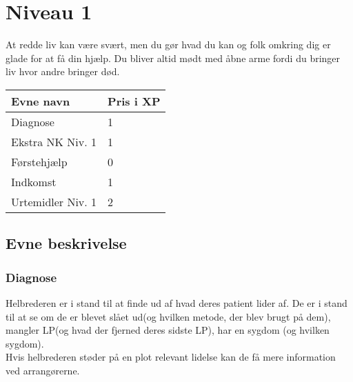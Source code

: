 \chapter{Niveau 1}
At redde liv kan være svært, men du gør hvad du kan og folk omkring dig er glade for at få din hjælp. Du bliver altid mødt med åbne arme fordi du bringer liv hvor andre bringer død.
\begin{table}[H]
    \centering
    \begin{tabular}{|p{}|p{}|}
    \rowcolor{cerulean!80}\hline
        Evne navn & Pris i XP \\\hline
        Diagnose & 1\\\hline
        Ekstra NK Niv. 1 & 1\\\hline
        Førstehjælp & 0\\\hline
        Indkomst &1 \\\hline
        Urtemidler Niv. 1 & 2\\\hline
    \end{tabular}
\end{table}

\section{Evne beskrivelse}

\subsection{Diagnose}
Helbrederen er i stand til at finde ud af hvad deres patient lider af. De er i stand til at se om de er blevet slået ud(og hvilken metode, der blev brugt på dem), mangler LP(og hvad der fjerned deres sidste LP), har en sygdom (og hvilken sygdom).\\
Hvis helbrederen støder på en plot relevant lidelse kan de få mere information ved arrangørerne.







